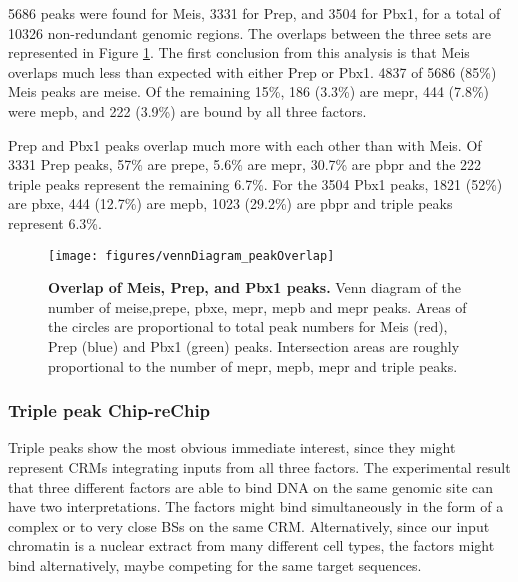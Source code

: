 5686 peaks were found for Meis, 3331 for Prep, and 3504 for Pbx1, for a total of 10326 non-redundant genomic regions. The overlaps between the three sets are represented in Figure \ref{fig:peakOverlap}. The first conclusion from this analysis is that Meis overlaps much less than expected with either Prep or Pbx1. 4837 of 5686 (85\%) Meis peaks are \ac{meise}. Of the remaining 15\%, 186 (3.3\%) are \ac{mepr}, 444 (7.8\%) were \ac{mepb}, and 222 (3.9\%) are bound by all three factors. 

Prep and Pbx1 peaks overlap much more with each other than with Meis. Of 3331 Prep peaks, 57\% are \ac{prepe},  5.6\% are \ac{mepr}, 30.7\% are \ac{pbpr} and the 222 triple peaks represent the remaining 6.7\%. For the 3504 Pbx1 peaks, 1821 (52\%) are \ac{pbxe}, 444 (12.7\%) are \ac{mepb}, 1023 (29.2\%) are \ac{pbpr} and triple peaks represent 6.3\%. 




\begin{figure}[]
  
  \centering
  \texttt{[image: figures/vennDiagram\_peakOverlap]}
  \caption[Overlap of Meis, Prep, and Pbx1 peaks]{\textbf{Overlap of Meis, Prep, and Pbx1 peaks.} Venn diagram of the number of \ac{meise},\ac{prepe}, \ac{pbxe}, \ac{mepr}, \ac{mepb} and \ac{mepr} peaks. Areas of the circles are proportional to total peak numbers for Meis (red), Prep (blue) and Pbx1 (green) peaks. Intersection areas are roughly proportional to the number of \ac{mepr}, \ac{mepb}, \ac{mepr} and triple peaks.}
  \label{fig:peakOverlap}
\end{figure}



\subsubsection{Triple peak Chip-reChip}

Triple peaks show the most obvious immediate interest, since they might represent \acp{CRM} integrating inputs from all three factors. The experimental result that three different factors are able to bind DNA on the same genomic site can have two interpretations. The factors might bind simultaneously in the form of a complex or to very close \acp{BS} on the same \ac{CRM}. Alternatively, since our input chromatin is a nuclear extract from many different cell types, the factors might bind alternatively, maybe competing for the same target sequences.

